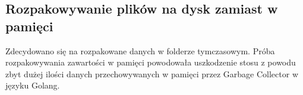 \subsection{Rozpakowywanie plików na dysk zamiast w pamięci}

Zdecydowano się na rozpakowane danych w folderze tymczasowym. Próba 
rozpakowywania zawartości w pamięci powodowała uszkodzenie stosu z powodu zbyt
dużej ilości danych przechowywanych w pamięci przez Garbage Collector w języku Golang.




